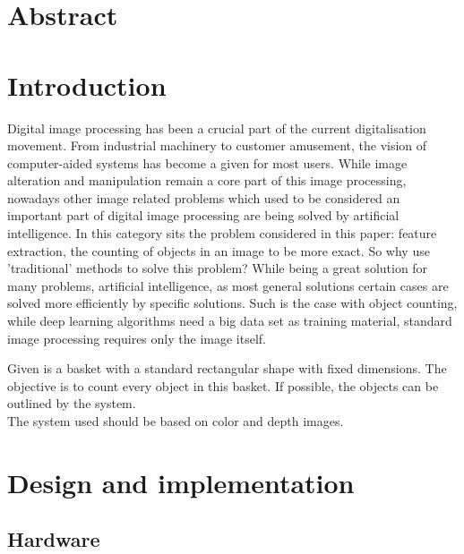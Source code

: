 \documentclass{article}
\begin{document}


\section*{Abstract}
\thispagestyle{empty}

\newpage
\tableofcontents
\thispagestyle{empty}

\newpage
\listoftables
\thispagestyle{empty}

\newpage
\listoffigures
\thispagestyle{empty}

\newpage
\section{Introduction}
Digital image processing has been a crucial part of the current digitalisation movement. From industrial machinery to customer amusement, the vision of computer-aided systems has become a given for most users. While image alteration and manipulation remain a core part of this image processing, nowadays other image related problems which used to be considered an important part of digital image processing are being solved by artificial intelligence. In this category sits the problem considered in this paper: feature extraction, the counting of objects in an image to be more exact. So why use 'traditional' methods to solve this problem? While being a great solution for many problems, artificial intelligence, as most general solutions certain cases are solved more efficiently by specific solutions. Such is the case with object counting, while deep learning algorithms need a big data set  as training material, standard image processing requires only the image itself.


\hspace{\parindent} Given is a basket with a standard rectangular shape with fixed dimensions. The objective is to count every object in this basket. If possible, the objects can be outlined by the system.\\

\noindent The system used should be based on color and depth images.


\section{Design and implementation}
\subsection{Hardware}
\end{document}
